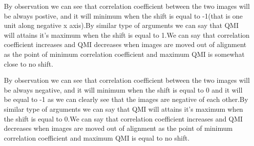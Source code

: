 \documentclass{article}
\theoremstyle{remark}
\begin{document}

\par
\par
By observation we can see that correlation coefficient between the two images will be always postive, and it will minimum when the shift is equal to -1(that is one unit along negative x axis).By similar type of arguments we can say that QMI will attains it's maximum when the shift is equal to 1.We can say that correlation coefficient increases and QMI decreases when images are moved out of alignment as the point of minimum correlation coefficient and maximum QMI is somewhat close to no shift. \par
By observation we can see that correlation coefficient between the two images will be always negative, and it will minimum when the shift is equal to 0 and it will be equal to -1 as we can clearly see that the images are negative of each other.By similar type of arguments we can say that QMI will attains it's maximum when the shift is equal to 0.We can say that correlation coefficient increases and QMI decreases when images are moved out of alignment as the point of minimum correlation coefficient and maximum QMI is equal to no shift. \par

\newpage
\newpage
\end{document}
